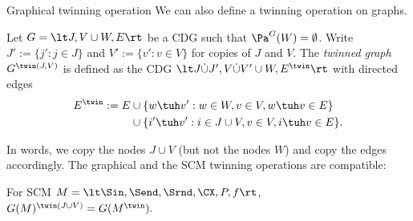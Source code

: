 \begin{frame}{Graphical twinning operation}
We can also define a twinning operation on graphs.
\begin{Def}[\ref{def:G_twinning}]
  Let $G=\lt J,V \cup W,E\rt$ be a CDG such that $\Pa^G(W) = \emptyset$. Write $J' := \{j' : j \in J\}$
  and $V' := \{v' : v \in V\}$ for copies of $J$ and $V$.
  The \emph{twinned graph
  $G^{\twin(J,V)}$} is defined as the CDG $\lt J \dot\cup J', V \dot\cup V' \cup W, E^\twin\rt$ with directed edges
  \begin{equation*}\begin{split}
    E^\twin := E & \cup \{w \tuh v' : w \in W, v \in V, w \tuh v \in E\}\\
                 & \cup \{i' \tuh v' : i \in J \cup V, v \in V, i \tuh v \in E\}.
  \end{split}\end{equation*}
\end{Def}
In words, we copy the nodes $J \cup V$ (but not the nodes $W$) and copy the edges accordingly.
The graphical and the SCM twinning operations are compatible:
\begin{Prp}[\ref{prp:compatibility_graph_twinning}]
  For SCM $M = \lt \Sin, \Send, \Srnd, \CX, P, f \rt$, $G(M)^{\twin(J\cup V)} = G(M^\twin).$
\end{Prp}
\end{frame}

